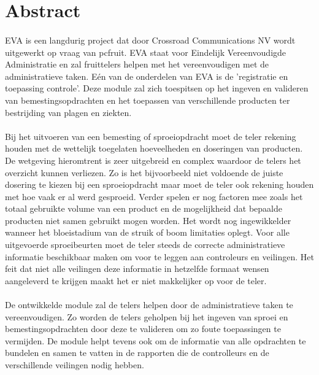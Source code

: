 \section* {Abstract}

\paragraph{}EVA is een langdurig project dat door Crossroad Communications NV wordt uitgewerkt op vraag van pcfruit. EVA staat voor Eindelijk Vereenvoudigde Administratie en zal fruittelers helpen met het vereenvoudigen met de administratieve taken. Eén van de onderdelen van EVA is de 'registratie en toepassing controle'. Deze module zal zich toespitsen op het ingeven en valideren van bemestingsopdrachten en het toepassen van verschillende producten ter bestrijding van plagen en ziekten.
\paragraph{}Bij het uitvoeren van een bemesting of sproeiopdracht moet de teler rekening houden met de wettelijk toegelaten hoeveelheden en doseringen van producten. De wetgeving hieromtrent is zeer uitgebreid en complex waardoor de telers het overzicht kunnen verliezen. Zo is het bijvoorbeeld niet voldoende de juiste dosering te kiezen bij een sproeiopdracht maar moet de teler ook rekening houden met hoe vaak er al werd gesproeid. Verder spelen er nog factoren mee zoals het totaal gebruikte volume van een product en de mogelijkheid dat bepaalde producten niet samen gebruikt mogen worden. Het wordt nog ingewikkelder wanneer het bloeistadium van de struik of boom limitaties oplegt. Voor alle uitgevoerde sproeibeurten moet de teler steeds de correcte administratieve informatie beschikbaar maken om voor te leggen aan controleurs en veilingen. Het feit dat niet alle veilingen deze informatie in hetzelfde formaat wensen aangeleverd te krijgen maakt het er niet makkelijker op voor de teler.
\paragraph{}De ontwikkelde module zal de telers helpen door de administratieve taken te vereenvoudigen. Zo worden de telers geholpen bij het ingeven van sproei en bemestingsopdrachten door deze te valideren om zo foute toepassingen te vermijden. De module helpt tevens ook om de informatie van alle opdrachten te bundelen en samen te vatten in de rapporten die de controlleurs en de verschillende veilingen nodig hebben.
